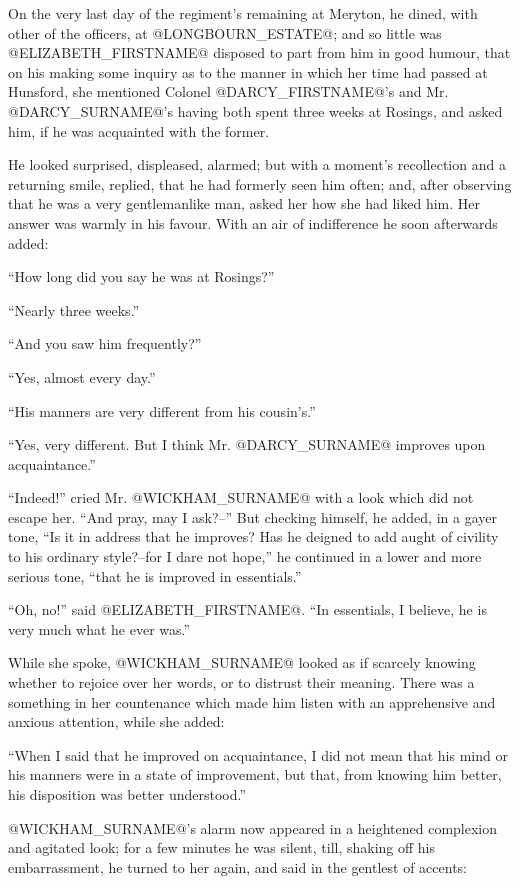 On the very last day of the regiment's remaining at Meryton, he dined,
with other of the officers, at @LONGBOURN_ESTATE@; and so little was @ELIZABETH_FIRSTNAME@
disposed to part from him in good humour, that on his making some
inquiry as to the manner in which her time had passed at Hunsford, she
mentioned Colonel @DARCY_FIRSTNAME@'s and Mr. @DARCY_SURNAME@'s having both spent three
weeks at Rosings, and asked him, if he was acquainted with the former.

He looked surprised, displeased, alarmed; but with a moment's
recollection and a returning smile, replied, that he had formerly seen
him often; and, after observing that he was a very gentlemanlike man,
asked her how she had liked him. Her answer was warmly in his favour.
With an air of indifference he soon afterwards added:

``How long did you say he was at Rosings?''

``Nearly three weeks.''

``And you saw him frequently?''

``Yes, almost every day.''

``His manners are very different from his cousin's.''

``Yes, very different. But I think Mr. @DARCY_SURNAME@ improves upon acquaintance.''

``Indeed!'' cried Mr. @WICKHAM_SURNAME@ with a look which did not escape her. ``And
pray, may I ask?--'' But checking himself, he added, in a gayer tone, ``Is
it in address that he improves? Has he deigned to add aught of civility
to his ordinary style?--for I dare not hope,'' he continued in a lower
and more serious tone, ``that he is improved in essentials.''

``Oh, no!'' said @ELIZABETH_FIRSTNAME@. ``In essentials, I believe, he is very much
what he ever was.''

While she spoke, @WICKHAM_SURNAME@ looked as if scarcely knowing whether to
rejoice over her words, or to distrust their meaning. There was a
something in her countenance which made him listen with an apprehensive
and anxious attention, while she added:

``When I said that he improved on acquaintance, I did not mean that
his mind or his manners were in a state of improvement, but that, from
knowing him better, his disposition was better understood.''

@WICKHAM_SURNAME@'s alarm now appeared in a heightened complexion and agitated
look; for a few minutes he was silent, till, shaking off his
embarrassment, he turned to her again, and said in the gentlest of
accents:


